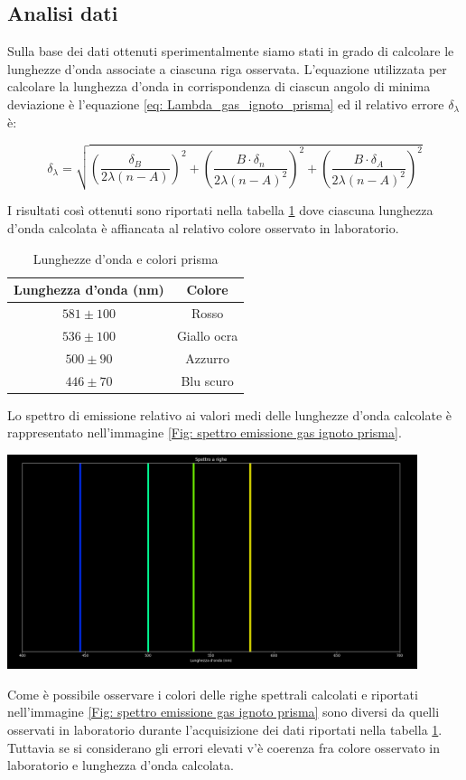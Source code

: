 \documentclass[a4paper]{article}
\begin{document}
\subsection{Analisi dati}
Sulla base dei dati ottenuti sperimentalmente siamo stati in grado di calcolare le lunghezze d'onda associate a ciascuna riga osservata. L'equazione utilizzata per calcolare la lunghezza d'onda in corrispondenza di ciascun angolo di minima deviazione è l'equazione \ref{eq: Lambda_gas_ignoto_prisma} ed il relativo errore $\delta_{\lambda}$ è:
\begin{center}
\[
\delta_\lambda = \sqrt{
\left( \frac{\delta_B}{2\lambda(n - A)} \right)^2 +
\left( \frac{B \cdot \delta_n}{2\lambda(n - A)^2} \right)^2 +
\left( \frac{B \cdot \delta_A}{2\lambda(n - A)^2} \right)^2
}
\]
\label{eq: errore su lambda}
\end{center}
I risultati così ottenuti sono riportati nella tabella \ref{tab: tabella lunghezze d'onda prisma} dove ciascuna lunghezza d'onda calcolata è affiancata al relativo colore osservato in laboratorio.
\begin{table}[h!]
\centering
\begin{tabular}{|c|c|}
\hline
\textbf{Lunghezza d'onda (nm)} & \textbf{Colore} \\
\hline
$581\pm 100$ & Rosso \\
$536\pm 100$ & Giallo ocra \\
$500\pm 90$& Azzurro \\
$446\pm 70$& Blu scuro \\
\hline
\end{tabular}
\caption{Lunghezze d'onda e colori prisma}
\label{tab: tabella lunghezze d'onda prisma}
\end{table}
Lo spettro di emissione relativo ai valori medi delle lunghezze d'onda calcolate è rappresentato nell'immagine \ref{Fig: spettro emissione gas ignoto prisma}.
\begin{center}
	\includegraphics[width=0.9\textwidth]{grafici/spettro emissione gas ignoto prisma.png}
\label{Fig: spettro emissione gas ignoto prisma}
\end{center}
Come è possibile osservare i colori delle righe spettrali calcolati e riportati nell'immagine \ref{Fig: spettro emissione gas ignoto prisma} sono diversi da quelli osservati in laboratorio durante l'acquisizione dei dati riportati nella tabella \ref{tab: tabella lunghezze d'onda prisma}. Tuttavia se si considerano gli errori elevati v'è coerenza fra colore osservato in laboratorio e lunghezza d'onda calcolata.
\end{document}
